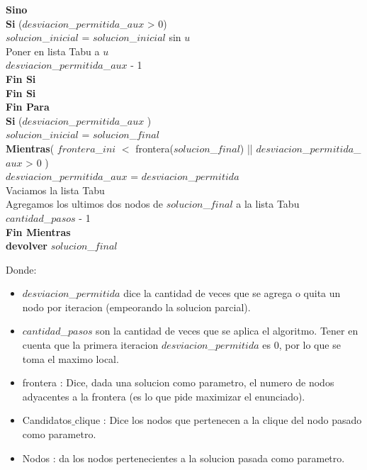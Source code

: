 \begin{algorithm}[H]
																 \textbf{Sino} \\
																              \textbf{Si} ($desviacion$\_$permitida$\_$aux$ > 0) \\
																							          $solucion$\_$inicial$ = $solucion$\_$inicial$ sin $u$ \\
																												Poner en lista Tabu a $u$ \\
																												$desviacion$\_$permitida$\_$aux$  - 1 \\
																 \textbf{Fin Si} \\
										 \textbf{Fin Si} \\
							\textbf{Fin Para} \\
							
							\textbf{Si} ($desviacion$\_$permitida$\_$aux$ ) \\
							      $solucion$\_$inicial$ = $solucion$\_$final$ \\
				    
				\textbf{Mientras}( $frontera$\_$ini$ $<$ frontera($solucion$\_$final$)  || $desviacion$\_$permitida$\_$aux$ > 0 ) \\
				
				$desviacion$\_$permitida$\_$aux$ = $desviacion$\_$permitida$  \\
				Vaciamos la lista Tabu \\
				Agregamos los ultimos dos nodos de $solucion$\_$final$ a la lista Tabu \\
				$cantidad$\_$pasos$ - 1 \\
	 \textbf{Fin Mientras} \\
    \textbf{devolver} $solucion$\_$final$ \\
		
\end{algorithm}

Donde:
\begin{itemize}
 \item $desviacion$\_$permitida$ dice la cantidad de veces que se agrega o quita un nodo por iteracion (empeorando la solucion parcial).
 \item $cantidad$\_$pasos$ son la cantidad de veces que se aplica el algoritmo. Tener en cuenta que la primera iteracion $desviacion$\_$permitida$ es 0, por lo que se toma el maximo local.
 \item frontera : Dice, dada una solucion como parametro, el numero de nodos adyacentes a la frontera (es lo que pide maximizar el enunciado).
 \item Candidatos$\_$clique : Dice los nodos que pertenecen a la clique del nodo pasado como parametro.
 \item Nodos : da los nodos pertenecientes a la solucion pasada como parametro.
\end{itemize}